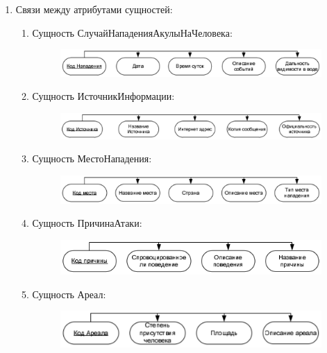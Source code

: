 \documentclass[russian,utf8,simple,emptystyle]{eskdtext}
\begin{document}
\begin{enumerate}
	\item Связи между атрибутами сущностей:
	\begin{enumerate}
		\item Сущность СлучайНападенияАкулыНаЧеловека:
		\begin{figure}[h!]
		\centering
		\includegraphics*[width=\textwidth]{inf1}
		\end{figure}
		
		\item Сущность ИсточникИнформации:
		\begin{figure}[h!]
		\centering
		\includegraphics*[width=\textwidth]{inf2}
		\end{figure}
		\clearpage
		
		\item Сущность МестоНападения:
		\begin{figure}[h!]
		\centering
		\includegraphics[width=\textwidth]{inf3}
		\end{figure}
		
		\item Сущность ПричинаАтаки:
		\begin{figure}[h!]
		\centering
		\includegraphics*[width=\textwidth]{inf4}
		\end{figure}
				
		\item Сущность Ареал:
		\begin{figure}[h!]
		\centering
		\includegraphics*[width=\textwidth]{inf5}
		\end{figure}		
		

\end{enumerate}
\end{enumerate}
\end{document}
